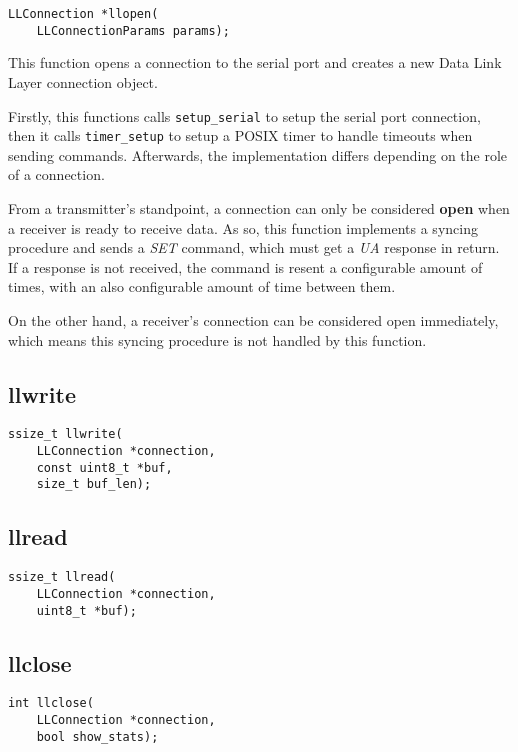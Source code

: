 \documentclass[11pt,a4paper,twocolumn]{article}
\begin{document}
\begin{lstlisting}
LLConnection *llopen(
    LLConnectionParams params);
\end{lstlisting}

This function opens a connection to the serial port and creates a new Data Link Layer connection object.

Firstly, this functions calls \lstinline{setup_serial} to setup the serial port connection, then it calls \lstinline{timer_setup} to setup a POSIX timer to handle timeouts when sending commands.
Afterwards, the implementation differs depending on the role of a connection.

From a transmitter's standpoint, a connection can only be considered \textbf{open} when a receiver is ready to receive data.
As so, this function implements a syncing procedure and sends a \textit{SET} command, which must get a \textit{UA} response in return.
If a response is not received, the command is resent a configurable amount of times, with an also configurable amount of time between them.

On the other hand, a receiver's connection can be considered open immediately, which means this syncing procedure is not handled by this function.

\subsection{llwrite}

\begin{lstlisting}
ssize_t llwrite(
    LLConnection *connection, 
    const uint8_t *buf, 
    size_t buf_len);
\end{lstlisting}

\subsection{llread}

\begin{lstlisting}
ssize_t llread(
    LLConnection *connection, 
    uint8_t *buf);
\end{lstlisting}

\subsection{llclose}

\begin{lstlisting}
int llclose(
    LLConnection *connection, 
    bool show_stats);
\end{lstlisting}
\end{document}
